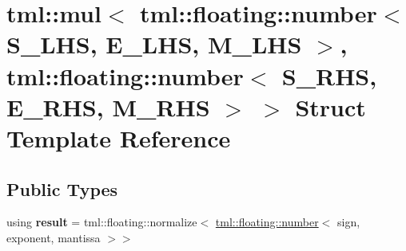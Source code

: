 \hypertarget{structtml_1_1mul_3_01tml_1_1floating_1_1number_3_01_s___l_h_s_00_01_e___l_h_s_00_01_m___l_h_s_01ac138e7545479133819191251e8549d2}{\section{tml\+:\+:mul$<$ tml\+:\+:floating\+:\+:number$<$ S\+\_\+\+L\+H\+S, E\+\_\+\+L\+H\+S, M\+\_\+\+L\+H\+S $>$, tml\+:\+:floating\+:\+:number$<$ S\+\_\+\+R\+H\+S, E\+\_\+\+R\+H\+S, M\+\_\+\+R\+H\+S $>$ $>$ Struct Template Reference}
\label{structtml_1_1mul_3_01tml_1_1floating_1_1number_3_01_s___l_h_s_00_01_e___l_h_s_00_01_m___l_h_s_01ac138e7545479133819191251e8549d2}
}
\subsection*{Public Types}
\begin{DoxyCompactItemize}
\item 
\hypertarget{structtml_1_1mul_3_01tml_1_1floating_1_1number_3_01_s___l_h_s_00_01_e___l_h_s_00_01_m___l_h_s_01ac138e7545479133819191251e8549d2_a24df8453bb21fb39690af6e7aefa05c8}{using {\bfseries result} = tml\+::floating\+::normalize$<$ \hyperlink{structtml_1_1floating_1_1number}{tml\+::floating\+::number}$<$ sign, exponent, mantissa $>$$>$}\label{structtml_1_1mul_3_01tml_1_1floating_1_1number_3_01_s___l_h_s_00_01_e___l_h_s_00_01_m___l_h_s_01ac138e7545479133819191251e8549d2_a24df8453bb21fb39690af6e7aefa05c8}

\end{DoxyCompactItemize}
